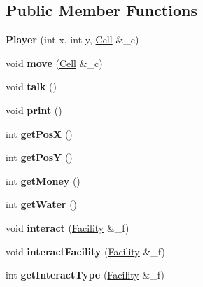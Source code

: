 \subsection*{Public Member Functions}
\begin{DoxyCompactItemize}
\item 
\mbox{\label{classPlayer_a72e5d1612217591793a1ba993c91e535}} 
{\bfseries Player} (int x, int y, \hyperlink{classCell}{Cell} \&\+\_\+c)
\item 
\mbox{\label{classPlayer_a5c98a8b7dac9f142f9e67045fad7b20d}} 
void {\bfseries move} (\hyperlink{classCell}{Cell} \&\+\_\+c)
\item 
\mbox{\label{classPlayer_ab4b53920da0f0d0535cdee8038602006}} 
void {\bfseries talk} ()
\item 
\mbox{\label{classPlayer_ae298148cd8152bbe1d2e237e76621ce2}} 
void {\bfseries print} ()
\item 
\mbox{\label{classPlayer_a63ac36d64eb946cdcf32738b6e562861}} 
int {\bfseries get\+PosX} ()
\item 
\mbox{\label{classPlayer_ac7417b01f2400f86fbe094ccb4a9bf5e}} 
int {\bfseries get\+PosY} ()
\item 
\mbox{\label{classPlayer_ac45154df7c4eb2d1d58255c3ff1c55dd}} 
int {\bfseries get\+Money} ()
\item 
\mbox{\label{classPlayer_adf90bca76e4f8bef954f5fc2e7105aed}} 
int {\bfseries get\+Water} ()
\item 
\mbox{\label{classPlayer_ad0720bb9057050eeb8fd7d525c577758}} 
void {\bfseries interact} (\hyperlink{classFacility}{Facility} \&\+\_\+f)
\item 
\mbox{\label{classPlayer_a5aebf3cb98eaa447c9e924cd4aaab4e1}} 
void {\bfseries interact\+Facility} (\hyperlink{classFacility}{Facility} \&\+\_\+f)
\item 
\mbox{\label{classPlayer_ad7157afcce10c7ac4bcabdc43d848032}} 
int {\bfseries get\+Interact\+Type} (\hyperlink{classFacility}{Facility} \&\+\_\+f)

\end{DoxyCompactItemize}
